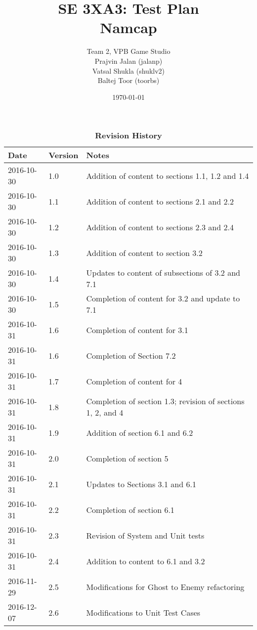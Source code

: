 \documentclass[12pt, titlepage]{article}
\title{SE 3XA3: Test Plan\\Namcap}
\author{Team 2, VPB Game Studio
		\\ Prajvin Jalan (jalanp)
		\\ Vatsal Shukla (shuklv2)
		\\ Baltej Toor (toorbs)
}
\date{\today}
\begin{document}
\maketitle

\tableofcontents
\listoftables
\listoffigures

\begin{table}
\caption{\bf Revision History}
\begin{tabularx}{\textwidth}{p{3cm}p{2cm}X}
\toprule {\bf Date} & {\bf Version} & {\bf Notes}\\
\midrule
2016-10-30 & 1.0 & Addition of content to sections 1.1, 1.2 and 1.4\\
2016-10-30 & 1.1 & Addition of content to sections 2.1 and 2.2\\
2016-10-30 & 1.2 & Addition of content to sections 2.3 and 2.4\\
2016-10-30 & 1.3 & Addition of content to section 3.2\\
2016-10-30 & 1.4 & Updates to content of subsections of 3.2 and 7.1\\
2016-10-30 & 1.5 & Completion of content for 3.2 and update to 7.1\\
2016-10-31 & 1.6 & Completion of content for 3.1\\
2016-10-31 & 1.6 & Completion of Section 7.2\\
2016-10-31 & 1.7 & Completion of content for 4\\
2016-10-31 & 1.8 & Completion of section 1.3; revision of sections 1, 2, and 4\\
2016-10-31 & 1.9 & Addition of section 6.1 and 6.2\\
2016-10-31 & 2.0 & Completion of section 5\\
2016-10-31 & 2.1 & Updates to Sections 3.1 and 6.1\\
2016-10-31 & 2.2 & Completion of section 6.1\\
2016-10-31 & 2.3 & Revision of System and Unit tests\\
2016-10-31 & 2.4 & Addition to content to 6.1 and 3.2\\
2016-11-29 & 2.5 & Modifications for Ghost to Enemy refactoring\\
2016-12-07 & 2.6 & Modifications to Unit Test Cases\\
\bottomrule
\end{tabularx}
\end{table}

\newpage

\end{document}
